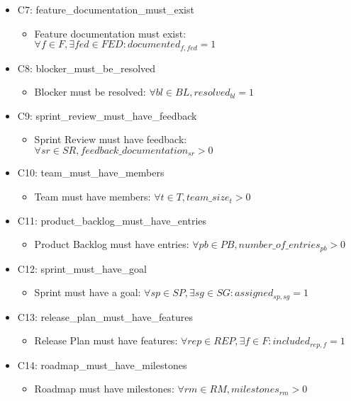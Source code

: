 \documentclass{article}
\begin{document}
\begin{itemize}
\begin{itemize}
        \end{itemize}
    \item C7: feature\_documentation\_must\_exist
        \begin{itemize}
            \item Feature documentation must exist: $\forall f \in F, \exists fed \in FED: documented_{f,fed} = 1$
        \end{itemize}
    \item C8: blocker\_must\_be\_resolved
        \begin{itemize}
            \item Blocker must be resolved: $\forall bl \in BL, resolved_{bl} = 1$
        \end{itemize}
    \item C9: sprint\_review\_must\_have\_feedback
        \begin{itemize}
            \item Sprint Review must have feedback: $\forall sr \in SR, feedback\_documentation_{sr} > 0$
        \end{itemize}
    \item C10: team\_must\_have\_members
        \begin{itemize}
            \item Team must have members: $\forall t \in T, team\_size_t > 0$
        \end{itemize}
    \item C11: product\_backlog\_must\_have\_entries
        \begin{itemize}
            \item Product Backlog must have entries: $\forall pb \in PB, number\_of\_entries_{pb} > 0$
        \end{itemize}
    \item C12: sprint\_must\_have\_goal
        \begin{itemize}
            \item Sprint must have a goal: $\forall sp \in SP, \exists sg \in SG: assigned_{sp,sg} = 1$
        \end{itemize}
    \item C13: release\_plan\_must\_have\_features
        \begin{itemize}
            \item Release Plan must have features: $\forall rep \in REP, \exists f \in F: included_{rep,f} = 1$
        \end{itemize}
    \item C14: roadmap\_must\_have\_milestones
        \begin{itemize}
            \item Roadmap must have milestones: $\forall rm \in RM, milestones_{rm} > 0$
        \end{itemize}
\end{itemize}
\end{document}
